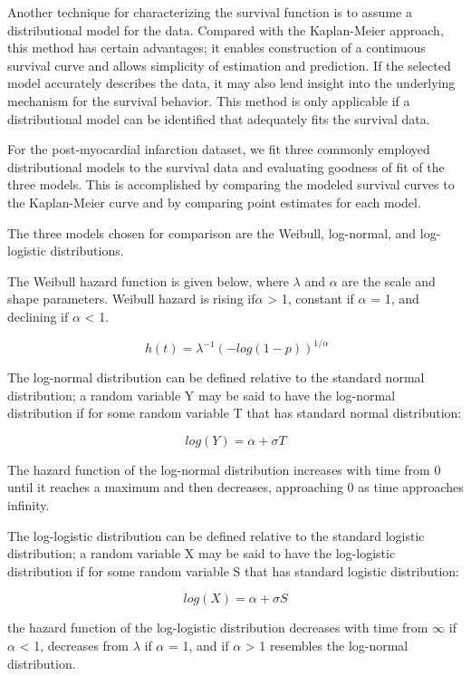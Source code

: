 \documentclass[
]{article}
\begin{document}
Another technique for characterizing the survival function is to assume
a distributional model for the data. Compared with the Kaplan-Meier
approach, this method has certain advantages; it enables construction of
a continuous survival curve and allows simplicity of estimation and
prediction. If the selected model accurately describes the data, it may
also lend insight into the underlying mechanism for the survival
behavior. This method is only applicable if a distributional model can
be identified that adequately fits the survival data.

For the post-myocardial infarction dataset, we fit three commonly
employed distributional models to the survival data and evaluating
goodness of fit of the three models. This is accomplished by comparing
the modeled survival curves to the Kaplan-Meier curve and by comparing
point estimates for each model.

The three models chosen for comparison are the Weibull, log-normal, and
log-logistic distributions.

The Weibull hazard function is given below, where \(\lambda\) and
\(\alpha\) are the scale and shape parameters. Weibull hazard is rising
if\(\alpha\) \textgreater{} 1, constant if \(\alpha\) = 1, and declining
if \(\alpha\) \textless{} 1.

\[ \ h(t) = {\lambda}^{-1}{(-log(1-p))}^{1/\alpha} \]

The log-normal distribution can be defined relative to the standard
normal distribution; a random variable Y may be said to have the
log-normal distribution if for some random variable T that has standard
normal distribution:

\[ log (Y) = \alpha + \sigma{T} \]

The hazard function of the log-normal distribution increases with time
from 0 until it reaches a maximum and then decreases, approaching 0 as
time approaches infinity.

The log-logistic distribution can be defined relative to the standard
logistic distribution; a random variable X may be said to have the
log-logistic distribution if for some random variable S that has
standard logistic distribution:

\[ log (X) = \alpha + \sigma{S} \]

the hazard function of the log-logistic distribution decreases with time
from \(\infty\) if \(\alpha\) \textless{} 1, decreases from \(\lambda\)
if \(\alpha\) = 1, and if \(\alpha\) \textgreater{} 1 resembles the
log-normal distribution.
\end{document}
